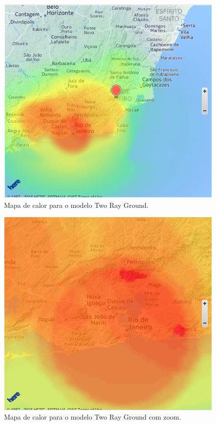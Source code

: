 \begin{figure}[htb]
\centering
\includegraphics[width=1.0\textwidth]{figs/tworayout}
\caption[Mapa de calor para o modelo Two Ray Ground.]
{Mapa de calor para o modelo Two Ray Ground.}
\label{fig:tworayout}
\end{figure} 

\begin{figure}[htb]
\centering
\includegraphics[width=1.0\textwidth]{figs/tworayin}
\caption[Mapa de calor para o modelo Two Ray Ground com zoom.]
{Mapa de calor para o modelo Two Ray Ground com zoom.}
\label{fig:tworayin}
\end{figure} 

